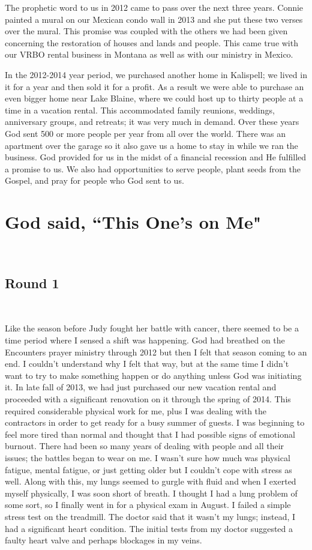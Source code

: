 \documentclass[twoside, 12pt]{book}
\begin{document}
The prophetic word to us in 2012 came to pass over the next three years. Connie painted a mural on our Mexican condo wall in 2013 and she put these two verses over the mural. This promise was coupled with the others we had been given concerning the restoration of houses and lands and people. This came true with our VRBO rental business in Montana as well as with our ministry in Mexico.

In the 2012-2014 year period, we purchased another home in Kalispell; we lived in it for a year and then sold it for a profit. As a result we were able to purchase an even bigger home near Lake Blaine, where we could host up to thirty people at a time in a vacation rental. This accommodated family reunions, weddings, anniversary groups, and retreats; it was very much in demand. Over these years God sent 500 or more people per year from all over the world. There was an apartment over the garage so it also gave us a home to stay in while we ran the business. God provided for us in the midst of a financial recession and He fulfilled a promise to us. We also had opportunities to serve people, plant seeds from the Gospel, and pray for people who God sent to us. 



\chapter{God said, ``This One's on Me"}
\

\section*{Round 1}
\

Like the season before Judy fought her battle with cancer, there seemed to be a time period where I sensed a shift was happening. God had breathed on the Encounters prayer ministry through 2012 but then I felt that season coming to an end. I couldn’t understand why I felt that way, but at the same time I didn’t want to try to make something happen or do anything unless God was initiating it. In late fall of 2013, we had just purchased our new vacation rental and proceeded with a significant renovation on it through the spring of 2014. This required considerable physical work for me, plus I was dealing with the contractors in order to get ready for a busy summer of guests. I was beginning to feel more tired than normal and thought that I had possible signs of emotional burnout. There had been so many years of dealing with people and all their issues; the battles began to wear on me. I wasn’t sure how much was physical fatigue, mental fatigue, or just getting older but I couldn’t cope with stress as well. Along with this, my lungs seemed to gurgle with fluid and when I exerted myself physically, I was soon short of breath. I thought I had a lung problem of some sort, so I finally went in for a physical exam in August. I failed a simple stress test on the treadmill. The doctor said that it wasn’t my lungs; instead, I had a significant heart condition. The initial tests from my doctor suggested a faulty heart valve and perhaps blockages in my veins. 
\end{document}
